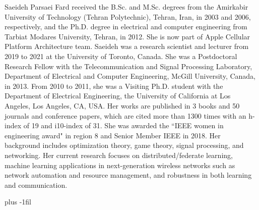 \documentclass[lettersize,journal]{IEEEtran}
\begin{document}
\begin{IEEEbiography}{Saeideh Parsaei Fard}%
 received the B.Sc. and M.Sc. degrees from the Amirkabir University of Technology (Tehran Polytechnic), Tehran, Iran, in 2003 and 2006, respectively, and the Ph.D. degree in electrical and computer engineering from Tarbiat Modares University, Tehran, in 2012. She is now part of Apple Cellular Platform Architecture team. Saeideh was a research scientist and lecturer from 2019 to 2021 at the University of Toronto, Canada. She was a Postdoctoral Research Fellow with the Telecommunication and Signal Processing Laboratory, Department of Electrical and Computer Engineering, McGill University, Canada, in 2013. From 2010 to 2011, she was a Visiting Ph.D. student with the Department of Electrical Engineering, the University of California at Los Angeles, Los Angeles, CA, USA. Her works are published in 3 books and 50 journals and conference papers, which are cited more than 1300 times with an h-index of 19 and i10-index of 31. She was awarded the “IEEE women in engineering award" in region 8 and Senior Member IEEE in 2018. Her background includes optimization theory, game theory, signal processing, and networking. Her current research focuses on distributed/federate learning, machine learning applications in next-generation wireless networks such as network automation and resource management, and robustness in both learning and communication. 
 \vspace{-1mm}
\end{IEEEbiography}
 \vskip 0pt plus -1fil
\end{document}
